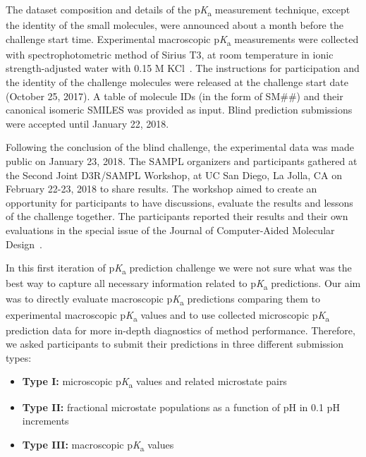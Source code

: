 \documentclass[9pt,lineno,final]{elife}
\newcommand{\pKa}{p\textit{K}\textsubscript{a}}
\begin{document}
The dataset composition and details of the \pKa{} measurement technique, except the identity of the small molecules, were announced about a month before the challenge start time. 
Experimental macroscopic \pKa{} measurements were collected with spectrophotometric method of Sirius T3, at room temperature in ionic strength-adjusted water with 0.15 M KCl~\citep{Isik:2018:J.Comput.AidedMol.Des.}. 
The instructions for participation and the identity of the challenge molecules were released at the challenge start date (October 25, 2017). 
A table of molecule IDs (in the form of SM\#\#) and	their canonical isomeric SMILES was provided as input.
Blind prediction submissions were accepted until January 22, 2018. 

Following the conclusion of the blind challenge, the experimental data was made public on January 23, 2018. The SAMPL organizers and participants gathered at the Second Joint D3R/SAMPL Workshop, at UC San Diego, La Jolla, CA on February 22-23, 2018 to share results.
The workshop aimed to create an opportunity for participants to have discussions, evaluate the results and lessons of the challenge together. 
The participants reported their results and their own evaluations in the special issue of the Journal of Computer-Aided Molecular Design~\citep{JCAMD_special_issue_pKa}. 

In this first iteration of \pKa{} prediction challenge we were not sure what was the best way to capture all necessary information related to \pKa{} predictions. Our aim was to directly evaluate macroscopic \pKa{} predictions comparing them to experimental macroscopic \pKa{} values and to use collected microscopic \pKa{} prediction data for more in-depth diagnostics of method performance.
Therefore, we asked participants to submit their predictions in three different submission types: 
\begin{itemize}
\item {\bf Type I:} microscopic \pKa{} values and related microstate pairs
\item {\bf Type II:} fractional microstate populations as a function of pH in 0.1 pH increments
\item {\bf Type III:} macroscopic \pKa{} values
\end{itemize}
\end{document}
